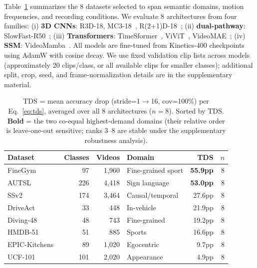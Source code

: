 \documentclass[runningheads]{llncs}
\newcommand{\tabtight}{\setlength{\tabcolsep}{3.5pt}\renewcommand{\arraystretch}{1.10}}
\newcommand{\TDS}{\textsc{TDS}}
\begin{document}
Table~\ref{tab:datasets} summarizes the 8 datasets selected to span semantic domains, motion frequencies, and recording conditions. We evaluate 8 architectures from four families: (i) \textbf{3D CNNs}: R3D-18, MC3-18~\cite{tran2019video}, R(2+1)D-18~\cite{tran2018r2plus1d}; (ii) \textbf{dual-pathway}: SlowFast-R50~\cite{feichtenhofer2019slowfast}; (iii) \textbf{Transformers}: TimeSformer~\cite{bertasius2021timesformer}, ViViT~\cite{arnab2021vivit}, VideoMAE~\cite{tong2022videomae}; (iv) \textbf{SSM}: VideoMamba~\cite{li2024videomamba}. All models are fine-tuned from Kinetics-400 checkpoints using AdamW with cosine decay. We use fixed validation clip lists across models (approximately 20 clips/class, or all available clips for smaller classes); additional split, crop, seed, and frame-normalization details are in the supplementary material.

\begin{table}[t]
\centering
\caption{\TDS{} = mean accuracy drop (stride=1$\to$16, cov=100\%) per Eq.~\ref{eq:tds}, averaged over all 8 architectures ($n{=}8$). Sorted by \TDS{}. \textbf{Bold} = the two co-equal highest-demand domains (their relative order is leave-one-out sensitive; ranks 3--8 are stable under the supplementary robustness analysis).}
\label{tab:datasets}
\scriptsize\tabtight
\begin{tabular}{l r r l r r}
\toprule
Dataset & Classes & Videos & Domain & \TDS{} & $n$ \\
\midrule
FineGym~\cite{shao2020finegym}       &  97 & 1,960 & Fine-grained sport & \textbf{55.9pp} & 8 \\
AUTSL~\cite{sincan2020autsl}         & 226 & 4,418 & Sign language      & \textbf{53.0pp} & 8 \\
SSv2~\cite{goyal2017ssv2}            & 174 & 3,464 & Causal/temporal    & 27.6pp          & 8 \\
DriveAct~\cite{martin2019driveact}   &  33 &   448 & In-vehicle         & 21.9pp          & 8 \\
Diving-48~\cite{li2018diving48}      &  48 &   743 & Fine-grained       & 19.2pp          & 8 \\
HMDB-51~\cite{kuehne2011hmdb}        &  51 &   885 & Sports             & 16.6pp          & 8 \\
EPIC-Kitchens~\cite{damen2022epic}   &  89 & 1,020 & Egocentric         &  9.7pp          & 8 \\
UCF-101~\cite{soomro2012ucf101}      & 101 & 2,020 & Appearance         &  4.9pp          & 8 \\
\bottomrule
\end{tabular}
\end{table}
\end{document}
